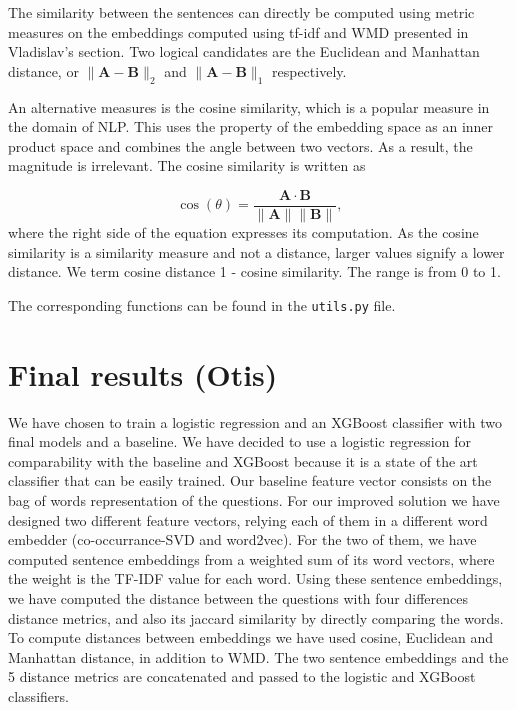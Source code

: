 \documentclass[11pt,a4paper]{article}
\begin{document}
The similarity between the sentences can directly be computed using metric measures on the embeddings computed using tf-idf and WMD presented in Vladislav's section. Two logical candidates are the Euclidean and Manhattan distance, or $\lVert \mathbf{A} - \mathbf{B}\rVert_2$ and $\lVert \mathbf{A} - \mathbf{B}\rVert_1$ respectively.

An alternative measures is the cosine similarity, which is a popular measure in the domain of NLP. This uses the property of the embedding space as an inner product space and combines the angle between two vectors. As a result, the magnitude is irrelevant. The cosine similarity is written as

$$
\cos(\theta)=\frac{\mathbf A\cdot \mathbf B}{\lVert \mathbf{A} \rVert \lVert \mathbf{B}\rVert},
$$
where the right side of the equation expresses its computation. As the cosine similarity is a similarity measure and not a distance, larger values signify a lower distance. We term cosine distance 1 - cosine similarity. The range is from 0 to 1.

The corresponding functions can be found in the \texttt{utils.py} file. 

\section{Final results (Otis)}

We have chosen to train a logistic regression and an XGBoost classifier with two final models and a baseline. We have decided to use a logistic regression for comparability with the baseline and XGBoost because it is a state of the art classifier that can be easily trained. Our baseline feature vector consists on the bag of words representation of the questions. For our improved solution we have designed two different feature vectors, relying each of them in a different word embedder (co-occurrance-SVD and word2vec). For the two of them, we have computed sentence embeddings from a weighted sum of its word vectors, where the weight is the TF-IDF value for each word. Using these sentence embeddings, we have computed the distance between the questions with four differences distance metrics, and also its jaccard similarity by directly comparing the words. To compute distances between embeddings we have used cosine, Euclidean and Manhattan distance, in addition to WMD. The two sentence embeddings and the 5 distance metrics are concatenated and passed to the logistic and XGBoost classifiers.
\end{document}
